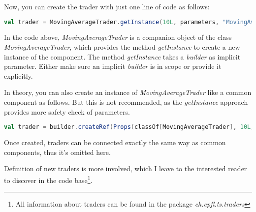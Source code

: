 Now, you can create the trader with just one line of code as follows:

\begin{lstlisting}[language=Scala]
  val trader = MovingAverageTrader.getInstance(10L, parameters, "MovingAverageTrader")
\end{lstlisting}

In the code above, \emph{MovingAverageTrader} is a companion object of the class \emph{MovingAverageTrader}, which provides the method \emph{getInstance} to create a new instance of the component. The method \emph{getInstance} takes a \emph{builder} as implicit parameter. Either make sure an implicit \emph{builder} is in scope or provide it explicitly.

\begin{warning}
In theory, you can also create an instance of \emph{MovingAverageTrader} like a common component as follows. But this is not recommended, as the \emph{getInstance} approach provides more safety check of parameters.

\begin{lstlisting}[language=Scala]
  val trader = builder.createRef(Props(classOf[MovingAverageTrader], 10L, parameters), "trader")
\end{lstlisting}
\end{warning}

Once created, traders can be connected exactly the same way as common components, thus it's omitted here.

Definition of new traders is more involved, which I leave to the interested reader to discover in the code base\footnote{All information about traders can be found in the package \emph{ch.epfl.ts.traders}}.
